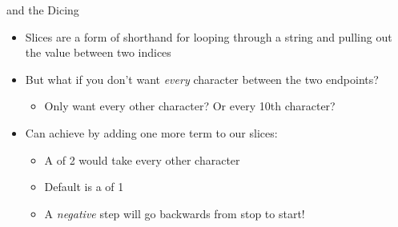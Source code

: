 \documentclass[pdf, aspectratio=169, 12pt]{beamer}
\begin{document}
\begin{frame}{and the Dicing}
	\begin{itemize}
		\item Slices are a form of shorthand for looping through a string and pulling out the value between two indices
		\item But what if you don't want \emph{every} character between the two endpoints?
			\begin{itemize}
				\item Only want every other character? Or every 10th character?
			\end{itemize}
		\item Can achieve by adding one more term to our slices:
			\begin{center}
			\end{center}
			\begin{itemize}
				\item A  of 2 would take every other character
				\item Default is a  of 1
				\item A \emph{negative} step will go backwards from stop to start!
			\end{itemize}
	\end{itemize}
\end{frame}
\end{document}
